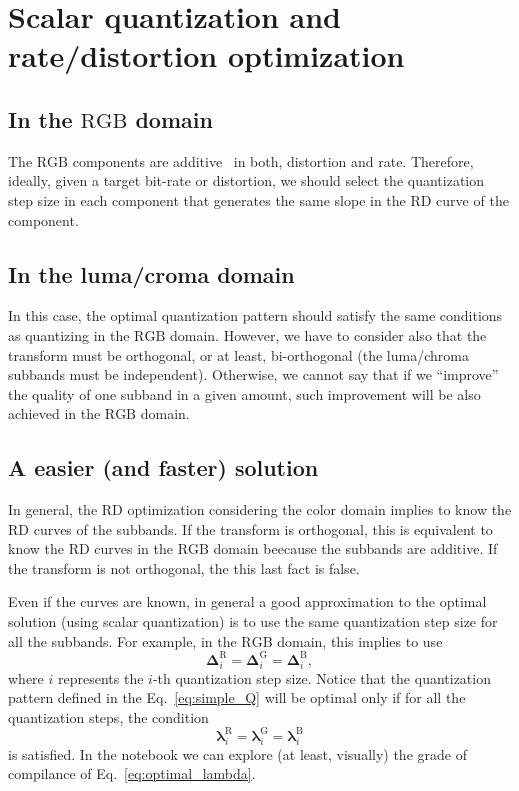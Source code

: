 \section{Scalar quantization and rate/distortion optimization}

\subsection{In the $\text{RGB}$ domain}

The $\text{RGB}$ components are additive~\cite{burger2016digital} in
both, distortion and rate. Therefore, ideally, given a
target bit-rate or distortion, we should select the quantization step
size in each component that generates the same slope in the RD curve
of the component.

\subsection{In the luma/croma domain}

In this case, the optimal quantization pattern should satisfy the same
conditions as quantizing in the $\text{RGB}$ domain. However, we have
to consider also that the transform must be orthogonal, or at least,
bi-orthogonal (the luma/chroma subbands must be
independent). Otherwise, we cannot say that if we ``improve'' the
quality of one subband in a given amount, such improvement will be
also achieved in the $\text{RGB}$ domain.

\subsection{A easier (and faster) solution}

In general, the RD optimization considering the color domain implies
to know the RD curves of the subbands. If the transform is orthogonal,
this is equivalent to know the RD curves in the $\text{RGB}$ domain
beecause the subbands are additive. If the transform is not
orthogonal, the this last fact is false.

Even if the curves are known, in general a good approximation to the
optimal solution (using scalar quantization) is to use the same
quantization step size for all the subbands. For example, in the
$\text{RGB}$ domain, this implies to use
\begin{equation}
  \mathbf{\Delta}^{\text{R}}_i = \mathbf{\Delta}^{\text{G}}_i =
  \mathbf{\Delta}^{\text{B}}_i,
  \label{eq:simple_Q}
\end{equation}
where $i$ represents the $i$-th quantization step size. Notice that
the quantization pattern defined in the Eq.~\eqref{eq:simple_Q} will
be optimal only if for all the quantization steps, the condition
\begin{equation}
  \mathbf{\lambda}^{\text{R}}_i = \mathbf{\lambda}^{\text{G}}_i =
  \mathbf{\lambda}^{\text{B}}_i
  \label{eq:optimal_lambda}
\end{equation}
is satisfied. In the notebook \href{https://github.com/Sistemas-Multimedia/Sistemas-Multimedia.github.io/blob/master/contents/RGB_SQ/RGB_SQ.ipynb}{} we can explore (at least, visually) the grade of compilance of
Eq.~\eqref{eq:optimal_lambda}.

